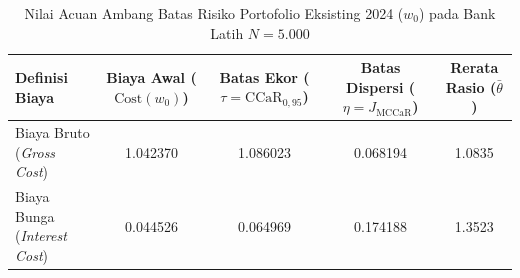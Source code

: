 \begin{table}[htbp]
\centering
\caption{Nilai Acuan Ambang Batas Risiko Portofolio Eksisting 2024 ($w_0$) pada Bank Latih $N=5.000$}
\label{tab:risk_limits}
\begin{tabular}{lcccc}
\toprule
\textbf{Definisi Biaya} & \textbf{Biaya Awal ($\text{Cost}(w_0)$)} & \textbf{Batas Ekor ($\tau = \text{CCaR}_{0{,}95}$)} & \textbf{Batas Dispersi ($\eta = J_{\text{MCCaR}}$)} & \textbf{Rerata Rasio ($\bar{\theta}$)} \\
\midrule
Biaya Bruto (\textit{Gross Cost}) & 1.042370 & 1.086023 & 0.068194 & 1.0835 \\
Biaya Bunga (\textit{Interest Cost}) & 0.044526 & 0.064969 & 0.174188 & 1.3523 \\
\bottomrule
\end{tabular}
\end{table}
